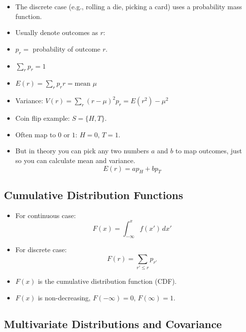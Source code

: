 \begin{itemize}
      \item The discrete case (e.g., rolling a die, picking a card) uses a probability mass function.
      \item Usually denote outcomes as $r$:
      \item $p_r =$ probability of outcome $r$.
      \item $\sum_r p_r = 1$
      \item $E(r) = \sum_r p_r r = \text{mean } \mu$
      \item Variance: $ V(r) = \sum_r (r-\mu)^2 p_r = E(r^2) - \mu^2$
      \item Coin flip example: $S = \{H, T\}$.
      \item Often map to $0$ or $1$: $H = 0$, $T = 1$.
      \item But in theory you can pick any two numbers $a$ and $b$ to map outcomes, just so you can calculate mean and variance.
            \[ E(r) = ap_H + bp_T \]
\end{itemize}

\subsection{Cumulative Distribution Functions}

\begin{itemize}
      \item For continuous case:
            \[ F(x) = \int_{-\infty}^{x} f(x') \, dx' \]
      \item For discrete case:
            \[ F(r) = \sum_{r' \leq r} p_{r'} \]
      \item $F(x)$ is the cumulative distribution function (CDF).
      \item $F(x)$ is non-decreasing, $F(-\infty) = 0$, $F(\infty) = 1$.
\end{itemize}

\subsection{Multivariate Distributions and Covariance}

